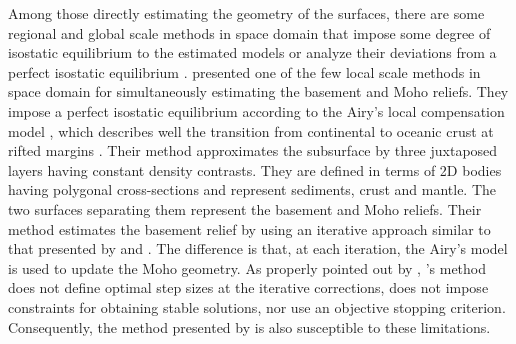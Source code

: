 \documentclass[manuscript]{geophysics}
\begin{document}
Among those directly estimating the geometry of the surfaces, 
there are some regional and global scale methods in space domain that impose 
some degree of isostatic equilibrium to the estimated models 
\citep[e.g.,][]{sunkel1985, sjoberg2009, bagherbandi-eshagh2012, sampietro2015}
or analyze their deviations from a perfect isostatic equilibrium
\citep[e.g.,][]{shin-etal2009}.
\citet{salem-etal2014} presented one of the few local scale methods in space 
domain for simultaneously estimating the basement and Moho reliefs. 
They impose a perfect isostatic equilibrium according to
the Airy's local compensation model \citep{turcotte-schubert2002}, 
which describes well the transition from continental to oceanic crust 
at rifted margins \citep{worzel1968}.
Their method approximates the subsurface by three juxtaposed layers having
constant density contrasts.
They are defined in terms of 2D bodies having polygonal
cross-sections and represent sediments, crust and mantle.
The two surfaces separating them represent the basement and Moho
reliefs. Their method estimates the basement
relief by using an iterative approach similar to that
presented by \citet{bott1960} and \citet{cordell-henderson1968}. 
The difference is that, at each iteration, the Airy's model is used 
to update the Moho geometry.
As properly pointed out by \citet{silva-etal2014}, \citeauthor{bott1960}'s
method does not define optimal step sizes at the iterative corrections,
does not impose constraints for obtaining stable solutions, nor use
an objective stopping criterion. 
Consequently, the method presented by \citet{salem-etal2014} is also susceptible 
to these limitations.
\end{document}

